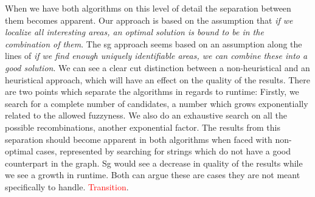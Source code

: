 \documentclass[thesis.tex]{subfiles}
\begin{document}
\par\noindent
When we have both algorithms on this level of detail the separation between them becomes apparent. Our approach is based on the assumption that \textit{if we localize all interesting areas, an optimal solution is bound to be in the combination of them}. The sg approach seems based on an assumption along the lines of \textit{if we find enough uniquely identifiable areas, we can combine these into a good solution}. We can see a clear cut distinction between a non-heuristical and an heuristical approach, which will have an effect on the quality of the results. There are two points which separate the algorithms in regards to runtime: Firstly, we search for a complete number of candidates, a number which grows exponentially related to the allowed fuzzyness. We also do an exhaustive search on all the possible recombinations, another exponential factor. The results from this separation should become apparent in both algorithms when faced with non-optimal cases, represented by searching for strings which do not have a good counterpart in the graph. Sg would see a decrease in quality of the results while we see a growth in runtime. Both can argue these are cases they are not meant specifically to handle. \textcolor{red}{Transition}.
\end{document}

